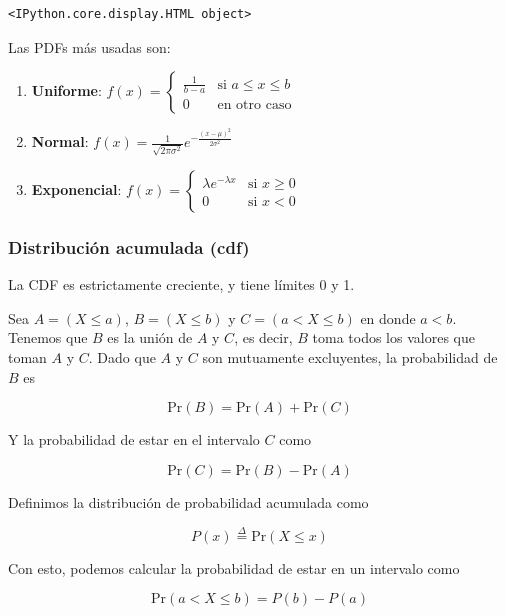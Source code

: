 \documentclass[
  letterpaper,
  DIV=11,
  numbers=noendperiod]{scrartcl}
\providecommand{\tightlist}{%
  \setlength{\itemsep}{0pt}\setlength{\parskip}{0pt}}\usepackage{longtable,booktabs,array}
\begin{document}
\begin{verbatim}
<IPython.core.display.HTML object>
\end{verbatim}

Las PDFs más usadas son:

\begin{enumerate}
\def\labelenumi{\arabic{enumi}.}
\tightlist
\item
  \textbf{Uniforme}:
  \(f(x) = \begin{cases} \frac{1}{b-a} & \text{si } a \leq x \leq b \\ 0 & \text{en otro caso} \end{cases}\)
\item
  \textbf{Normal}:
  \(f(x) = \frac{1}{\sqrt{2\pi\sigma^2}}e^{-\frac{(x-\mu)^2}{2\sigma^2}}\)
\item
  \textbf{Exponencial}:
  \(f(x) = \begin{cases} \lambda e^{-\lambda x} & \text{si } x \geq 0 \\ 0 & \text{si } x < 0 \end{cases}\)
\end{enumerate}

\hypertarget{distribuciuxf3n-acumulada-cdf}{%
\subsubsection{Distribución acumulada
(cdf)}\label{distribuciuxf3n-acumulada-cdf}}

La CDF es estrictamente creciente, y tiene límites 0 y 1.

Sea \(A = (X \leq a)\), \(B = (X \leq b)\) y \(C = (a < X \leq b)\) en
donde \(a < b\). Tenemos que \(B\) es la unión de \(A\) y \(C\), es
decir, \(B\) toma todos los valores que toman \(A\) y \(C\). Dado que
\(A\) y \(C\) son mutuamente excluyentes, la probabilidad de \(B\) es

\[\text{Pr}(B) = \text{Pr}(A) + \text{Pr}(C) \tag{7} \]

Y la probabilidad de estar en el intervalo \(C\) como

\[
  \text{Pr}(C) = \text{Pr}(B) - \text{Pr}(A) \tag{8}
\]

Definimos la distribución de probabilidad acumulada como

\[
   P(x) \overset{\Delta}{=} \text{Pr}(X \leq x)
\]

Con esto, podemos calcular la probabilidad de estar en un intervalo como

\[
  \text{Pr}(a < X \leq b) = P(b) - P(a) \tag{9}
\]
\end{document}
